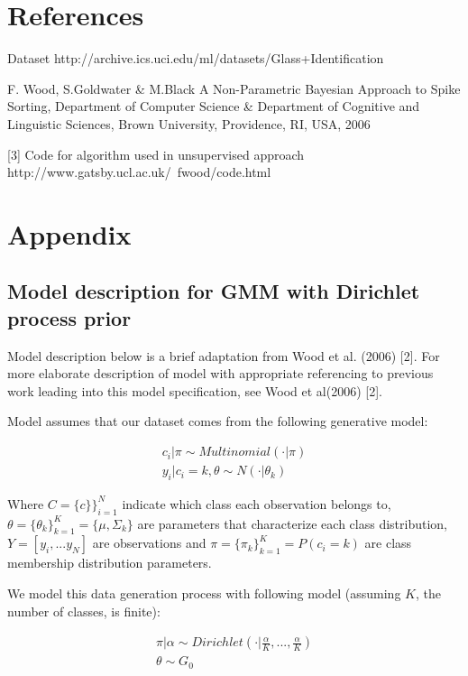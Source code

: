 \documentclass[a4paper]{article}
\begin{document}
\section{References}
\par
[1] Dataset http://archive.ics.uci.edu/ml/datasets/Glass+Identification
\par
[2] F. Wood, S.Goldwater \& M.Black A Non-Parametric Bayesian Approach to Spike Sorting, Department of Computer Science \& Department of Cognitive and Linguistic Sciences, Brown University, Providence, RI, USA, 2006

[3] Code for algorithm used in unsupervised approach http://www.gatsby.ucl.ac.uk/~fwood/code.html

\section{Appendix}

\subsection{Model description for GMM with Dirichlet  process prior}

 Model description below is a brief adaptation from Wood et al. (2006) [2]. For more elaborate description of model with appropriate referencing to previous work leading into this model specification, see  Wood et al(2006) [2]. 

Model assumes that our dataset comes from the following generative model:

\begin{equation}
\begin{aligned}
c_i | \pi \sim Multinomial(\cdot | \pi) \\
y_i | c_i = k, \theta \sim N(\cdot | \theta_k)
\end{aligned}
\end{equation}

Where $C=\{c\}\}^{N}_{i=1}$ indicate which class each observation belongs to, $\theta=\{\theta_k\}^K_{k=1}=\{\mu, \Sigma_{k}\}$ are parameters that characterize each class distribution, $Y=[y_i, ... y_N]$ are observations and $\pi=\{\pi_k\}^K_{k=1}=P(c_i=k)$ are class membership distribution parameters.

We model this data generation process with following model (assuming $K$, the number of classes, is finite):

\begin{equation}
\begin{aligned}
\pi | \alpha \sim Dirichlet(\cdot | \frac{\alpha}{K}, ... , \frac{\alpha}{K}) \\
\theta \sim G_0
\end{aligned}
\end{equation}
\end{document}
